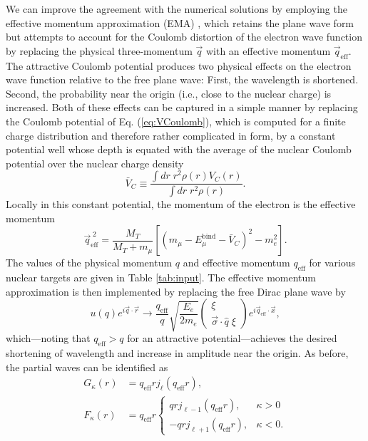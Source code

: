 \documentclass[12pt,letterpaper]{book}
\begin{document}
We can improve the agreement with the numerical solutions by employing the effective momentum approximation (EMA) \cite{KNOLL1974462,LENZ1971513}, which retains the plane wave form but attempts to account for the Coulomb distortion of the electron wave function by replacing the physical three-momentum $\vec{q}$ with an effective momentum $\vec{q}_\mathrm{eff}$. The attractive Coulomb potential produces two physical effects on the electron wave function relative to the free plane wave: First, the wavelength is shortened. Second, the probability near the origin (i.e., close to the nuclear charge) is increased. Both of these effects can be captured in a simple manner by replacing the Coulomb potential of Eq. (\ref{eq:VCoulomb}), which is computed for a finite charge distribution and therefore rather complicated in form, by a constant potential well whose depth is equated with the average of the nuclear Coulomb potential over the nuclear charge density
\begin{equation}
\bar{V}_C\equiv \frac{\int dr \;r^2 \rho(r) V_C(r)}{\int dr \;r^2 \rho(r)}.
\end{equation}
Locally in this constant potential, the momentum of the electron is the effective momentum
\begin{equation}
\vec{q}_\mathrm{eff}^{\;2}=\frac{M_T}{M_T+m_{\mu}}\left[\left(m_{\mu}-E_{\mu}^\mathrm{bind}-\bar{V}_C\right)^2-m_e^2\right].
\end{equation}
The values of the physical momentum $q$ and effective momentum $q_\mathrm{eff}$ for various nuclear targets are given in Table \ref{tab:input}. The effective momentum approximation is then implemented by replacing the free Dirac plane wave by 
\begin{equation}
u(q)e^{i\vec{q}\cdot\vec{r}}\rightarrow\frac{q_\mathrm{eff}}{q}\sqrt{\frac{E_e}{2m_e}}\left(\begin{array}{c}
\xi\\
\vec{\sigma}\cdot\hat{q}\;\xi
\end{array}\right)
e^{i\vec{q}_\mathrm{eff}\cdot\vec{x}},
\end{equation}
which---noting that $q_\mathrm{eff}>q$ for an attractive potential---achieves the desired shortening of wavelength and increase in amplitude near the origin. As before, the partial waves can be identified as
\begin{equation}
\begin{split}
G_{\kappa}(r)&=q_\mathrm{eff}rj_{\ell}(q_\mathrm{eff}r),\\
F_{\kappa}(r)&=q_\mathrm{eff}r\left\{\begin{array}{cc}
qrj_{\ell-1}(q_\mathrm{eff}r), & \kappa>0\\
-qrj_{\ell+1}(q_\mathrm{eff}r), &\kappa < 0.
\end{array}\right. 
\end{split}
\label{eq:ema_bessel}
\end{equation}
\end{document}
